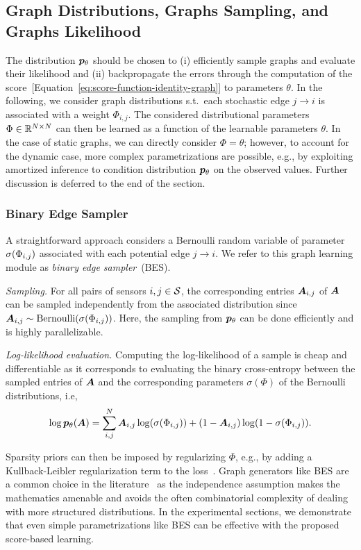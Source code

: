 \subsection{Graph Distributions, Graphs Sampling, and Graphs Likelihood}\label{s:sampling}

The distribution ${{\bm{p}}_\theta}$ should be chosen to (i) efficiently sample graphs and evaluate their likelihood and (ii) backpropagate the errors through the computation of the score~[Equation~\eqref{eq:score-function-identity-graph}] to parameters $\theta$.
In the following, we  consider graph distributions s.t.\ each stochastic edge $j\to i$ is associated with a weight $\Phi_{i,j}$. 
The considered distributional parameters $\Phi \in {\mathbb{R}}^{N\times N}$ can then be learned as a function of the learnable parameters $\theta$.
In the case of static graphs, we can directly consider $\Phi=\theta$; however, to account for the dynamic case, more complex parametrizations are possible, e.g., by exploiting amortized inference to condition distribution ${{\bm{p}}_\theta}$ on the observed values. Further discussion is deferred to the end of the section. 

\subsubsection{Binary Edge Sampler}
A straightforward approach considers a Bernoulli random variable of parameter $\sigma(\Phi_{i,j})$ associated with each potential edge $j\to i$. We refer to this graph learning module as \emph{binary edge sampler}~(BES).

\textit{Sampling.} 
For all pairs of sensors $i,j\in\mathcal{S}$, the corresponding entries ${\bm{A}}_{i,j}$ of ${\bm{A}}$ can be sampled independently from the associated distribution since ${\bm{A}}_{i,j} \sim \text{Bernoulli}(\sigma(\Phi_{i,j}))$. Here, the sampling from ${{\bm{p}}_\theta}$ can be done efficiently and is highly parallelizable.

\textit{Log-likelihood evaluation.} Computing the log-likelihood of a sample is cheap and differentiable as it corresponds to evaluating the binary cross-entropy between the sampled entries of ${\bm{A}}$ and the corresponding parameters $\sigma(\Phi)$ of the Bernoulli distributions, i.e,
\begin{equation}
\log {{\bm{p}}_\theta}({\bm{A}}) = \sum_{i,j}^N {\bm{A}}_{i,j} \log(\sigma(\Phi_{i,j})) + (1 - {\bm{A}}_{i,j}) \log(1 - \sigma(\Phi_{i,j})).   
\end{equation}

Sparsity priors can then be imposed by regularizing $\Phi$, e.g., by adding a Kullback-Leibler regularization term to the loss~\citep{shang2021discrete, kipf2018neural}. 
Graph generators like BES are a common choice in the literature~\citep{franceschi2019learning, shang2021discrete} as the independence assumption makes the mathematics amenable and avoids the often combinatorial complexity of dealing with more structured distributions. In the experimental sections, we demonstrate that even simple parametrizations like BES can be effective with the proposed score-based learning.

